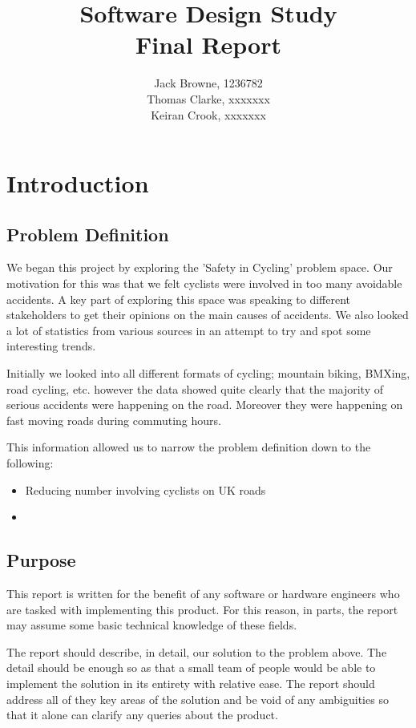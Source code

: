 \documentclass[]{report}
\title{Software Design Study\\Final Report}
\author{Jack Browne, 1236782\\Thomas Clarke, xxxxxxx\\Keiran Crook, xxxxxxx}
\begin{document}
\maketitle

\tableofcontents

\chapter{Introduction}
\section{Problem Definition}
We began this project by exploring the 'Safety in Cycling' problem space. Our motivation for this was that we felt cyclists were involved in too many avoidable accidents. 
A key part of exploring this space was speaking to different stakeholders to get their opinions on the main causes of accidents. We also looked a lot of statistics from various sources in an attempt to try and spot some interesting trends.

Initially we looked into all different formats of cycling; mountain biking, BMXing, road cycling, etc. however the data showed quite clearly that the majority of serious accidents were happening on the road. Moreover they were happening on fast moving roads during commuting hours.

This information allowed us to narrow the problem definition down to the following:
\begin{itemize}
  \item Reducing number involving cyclists on UK roads
  \item 
\end{itemize}
\section{Purpose}
This report is written for the benefit of any software or hardware engineers who are tasked with implementing this product. For this reason, in parts, the report may assume some basic technical knowledge of these fields. 

The report should describe, in detail, our solution to the problem above. The detail should be enough so as that a small team of people would be able to implement the solution in its entirety with relative ease. The report should address all of they key areas of the solution and be void of any ambiguities so that it alone can clarify any queries about the product.
\end{document}

